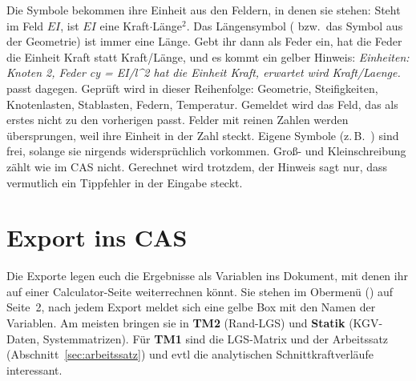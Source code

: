 Die Symbole bekommen ihre Einheit aus den Feldern, in denen sie stehen: Steht  im Feld
$EI$, ist $EI$ eine Kraft$\cdot$Länge$^2$. Das Längensymbol ( bzw.\ das Symbol aus der
Geometrie) ist immer eine Länge. Gebt ihr dann als Feder  ein, hat die Feder die
Einheit Kraft statt Kraft/Länge, und es kommt ein gelber Hinweis:
\emph{Einheiten: Knoten 2, Feder cy = EI/l\^{}2 hat die Einheit Kraft, erwartet wird
Kraft/Laenge.}  passt dagegen. Geprüft wird in dieser Reihenfolge: Geometrie,
Steifigkeiten, Knotenlasten, Stablasten, Federn, Temperatur. Gemeldet wird das Feld, das als erstes
nicht zu den vorherigen passt. Felder mit reinen Zahlen werden übersprungen, weil ihre Einheit in
der Zahl steckt. Eigene Symbole (z.\,B.\ ) sind frei, solange sie nirgends
widersprüchlich vorkommen. Groß- und Kleinschreibung zählt wie im CAS nicht. Gerechnet wird
trotzdem, der Hinweis sagt nur, dass vermutlich ein Tippfehler in der Eingabe steckt.


\section{Export ins CAS}\label{sec:export}

Die Exporte legen euch die Ergebnisse als Variablen ins Dokument, mit denen ihr auf einer
Calculator-Seite weiterrechnen könnt. Sie stehen im Obermenü () auf Seite~2, nach jedem
Export meldet sich eine gelbe Box mit den Namen der Variablen. Am meisten bringen sie in
\textbf{TM2} (Rand-LGS) und \textbf{Statik} (KGV-Daten, Systemmatrizen). Für \textbf{TM1} sind 
die LGS-Matrix und der Arbeitssatz (Abschnitt~\ref{sec:arbeitssatz}) und evtl die analytischen Schnittkraftverläufe interessant.

